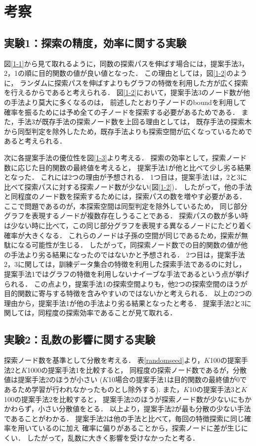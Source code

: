 \chapter{考察}
\label{考察}
\section{実験1：探索の精度，効率に関する実験}
図\ref{1-1}から見て取れるように，同数の探索パスを伸ばす場合には，提案手法3，2，1の順に目的関数の値が良い値となった．
この理由としては，図\ref{1-2}のように，
ランダムに探索パスを伸ばすよりもグラフの特徴を利用した方が広く探索を行えるからであると考えられる．
図\ref{1-2}において，提案手法3のノード数が他の手法より莫大に多くなるのは，
前述したとおり子ノードのboundを利用して確率を振るためには予め全ての子ノードを探索する必要があるためである．
また，手法3が既存手法の探索ノード数を上回る理由としては，
既存手法の探索木から同型判定を除外したため，既存手法よりも探索空間が広くなっているためであると考えられる．

次に各提案手法の優位性を図\ref{1-3}より考える．
探索の効率として，探索ノード数に応じた目的関数の最終値を考えると，
提案手法1が他と比べて少し劣る結果となった．
これには2つの理由が予想される．
1つ目は，提案手法1は，2と3に比べて探索パスに対する探索ノード数が少ない(図\ref{1-2})．
したがって，他の手法と同程度のノード数を探索するためには，探索パスの数を増やす必要がある．
ここで問題であるのが，本探索空間は同型判定を除外しているため，
同じ部分グラフを表現するノードが複数存在しうることである．
探索パスの数が多い時は少ない時に比べて，この同じ部分グラフを表現する異なるノードにたどり着く確率が大きくなる．
これらのノードは子孫の空間が同じであるため，探索が無駄になる可能性が生じる．
したがって，同探索ノード数での目的関数の値が他の手法より劣る結果になったのではないかと予想される．
2つ目は，提案手法2，3に関しては，訓練データ集合の特徴を利用した探索手法であるのに対し，
提案手法1ではグラフの特徴を利用しないナイーブな手法であるという点が挙げられる．
この点より，提案手法1の探索空間よりも，他2つの探索空間のほうが
目的関数に寄与する特徴を含みやすいのではないかと考えられる．
以上の2つの理由から，提案手法1が他の手法より劣る結果となったと考る．
提案手法2と3に関しては，同程度の探索効率であることが見て取れる．

\section{実験2：乱数の影響に関する実験}
探索ノード数を基準として分散を考える．
表\ref{randomseed}より，$K$100の提案手法2と$K$1000の提案手法1を比較すると，
同程度の探索ノード数であるが，分散値は提案手法2のほうが小さい
($K$10場合の提案手法1は目的関数の最終値が0であるため学習が行われなかったものとし除外する).
また，$K$10の提案手法3と$K$100の提案手法2を比較すると，
提案手法2のほうが探索ノード数が少ないにもかかわらず，小さい分散値をとる．
以上より，提案手法2が最も分散の少ない手法であることがわかる．
提案手法2は他の手法と比べて，毎回の特徴探索に同じ確率を用いているのに加え
確率に偏りがあることから，探索ノードに差が生じにくい．
したがって，乱数に大きく影響を受けなかったと考る．

